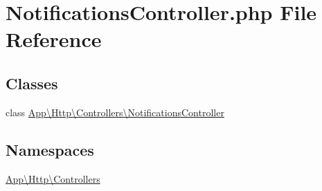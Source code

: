\hypertarget{_notifications_controller_8php}{}\section{Notifications\+Controller.\+php File Reference}
\label{_notifications_controller_8php}
\subsection*{Classes}
\begin{DoxyCompactItemize}
\item 
class \mbox{\hyperlink{class_app_1_1_http_1_1_controllers_1_1_notifications_controller}{App\textbackslash{}\+Http\textbackslash{}\+Controllers\textbackslash{}\+Notifications\+Controller}}
\end{DoxyCompactItemize}
\subsection*{Namespaces}
\begin{DoxyCompactItemize}
\item 
 \mbox{\hyperlink{namespace_app_1_1_http_1_1_controllers}{App\textbackslash{}\+Http\textbackslash{}\+Controllers}}
\end{DoxyCompactItemize}
